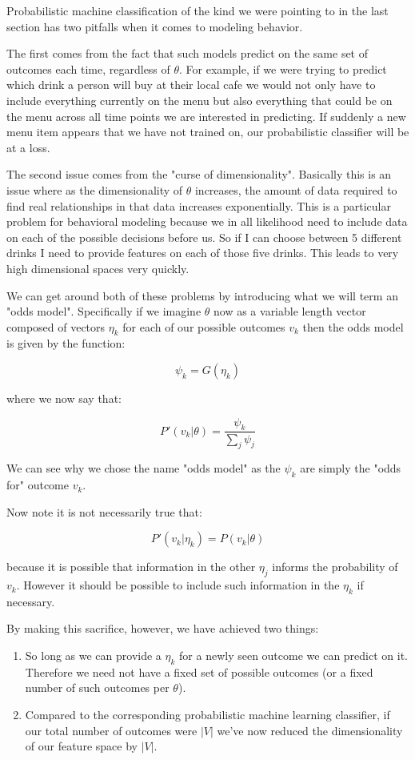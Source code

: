 \documentclass[11pt]{article}
\begin{document}
Probabilistic machine classification of the kind we were pointing to in the last section has two pitfalls when it comes to modeling behavior. 

The first comes from the fact that such models predict on the same set of outcomes each time, regardless of $\theta$. For example, if we were trying to predict which drink a person will buy at their local cafe we would not only have to include everything currently on the menu but also everything that could be on the menu across all time points we are interested in predicting. If suddenly a new menu item appears that we have not trained on, our probabilistic classifier will be at a loss. 

The second issue comes from the "curse of dimensionality". Basically this is an issue where as the dimensionality of $\theta$ increases, the amount of data required to find real relationships in that data increases exponentially. This is a particular problem for behavioral modeling because we in all likelihood need to include data on each of the possible decisions before us. So if I can choose between 5 different drinks I need to provide features on each of those five drinks. This leads to very high dimensional spaces very quickly. \newline


We can get around both of these problems by introducing what we will term an "odds model". Specifically if we imagine $\theta$ now as a variable length vector composed of vectors $\eta_k$ for each of our possible outcomes $v_k$ then the odds model is given by the function:

$$\psi_k=G(\eta_k)$$

where we now say that:

$$P'(v_k|\theta) = \frac{\psi_k}{\sum_j \psi_j}$$

We can see why we chose the name "odds model" as the $\psi_k$ are simply the "odds for" outcome $v_k$. \newline

Now note it is not necessarily true that:

$$P'(v_k|\eta_k) = P(v_k|\theta)$$

because it is possible that information in the other $\eta_j$ informs the probability of $v_k$. However it should be possible to include such information in the $\eta_k$ if necessary. 

By making this sacrifice, however, we have achieved two things:

\begin{enumerate}
\item So long as we can provide a $\eta_k$ for a newly seen outcome we can predict on it. Therefore we need not have a fixed set of possible outcomes (or a fixed number of such outcomes per $\theta$).
\item Compared to the corresponding probabilistic machine learning classifier, if our total number of outcomes were $|V|$ we've now reduced the dimensionality of our feature space by $|V|$. 
\end{enumerate}
\end{document}
